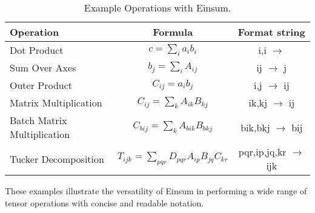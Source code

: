 \begin{table}[hbp]
    \caption{Example Operations with Einsum.}
    \label{tab:einsum:ops}
    \centering
    \def\arraystretch{1.1}
    \begin{tabular}{lcc}
        \toprule
        \textbf{Operation}                 & \textbf{Formula}                                    & \textbf{Format string}         \\
        \midrule
        Dot Product                        & $c = \sum_{i} a_{i} b_{i}$                          & i,i $\rightarrow$              \\
        Sum Over Axes                      & $b_{j} = \sum_{i} A_{ij}$                           & ij $\rightarrow$ j             \\
        Outer Product                      & $C_{ij} = a_{i} b_{j}$                              & i,j $\rightarrow$ ij           \\
        Matrix Multiplication              & $C_{ij} = \sum_{k} A_{ik} B_{kj}$                   & ik,kj $\rightarrow$ ij         \\
        Batch Matrix Multiplication        & $C_{bij} = \sum_{k} A_{bik} B_{bkj}$                & bik,bkj $\rightarrow$ bij      \\
        Tucker Decomposition \cite{tucker} & $T_{ijk} = \sum_{pqr} D_{pqr} A_{ip} B_{jq} C_{kr}$ & pqr,ip,jq,kr $\rightarrow$ ijk \\
        \bottomrule
    \end{tabular}
\end{table}

\noindent
These examples illustrate the versatility of Einsum in performing a wide range of 
tensor operations with concise and readable notation.
